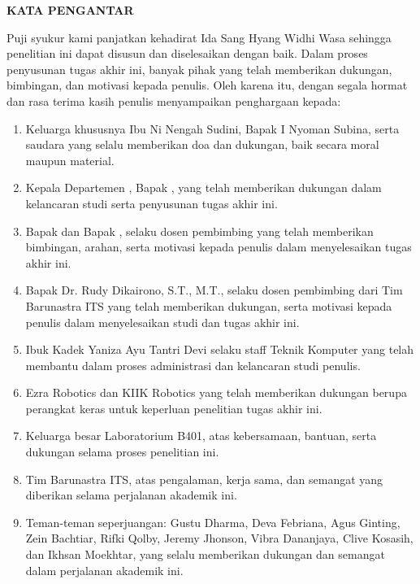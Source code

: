 \begin{center}
  \Large
  \textbf{KATA PENGANTAR}
\end{center}


\vspace{2ex}


Puji syukur kami panjatkan kehadirat Ida Sang Hyang Widhi Wasa  sehingga penelitian ini dapat disusun dan diselesaikan dengan baik. Dalam proses penyusunan tugas akhir ini, banyak pihak yang telah memberikan dukungan, bimbingan, dan motivasi kepada penulis. Oleh karena itu, dengan segala hormat dan rasa terima kasih  penulis menyampaikan penghargaan kepada:

\begin{enumerate}[nolistsep]
  \item Keluarga khususnya Ibu Ni Nengah Sudini, Bapak I Nyoman Subina, serta saudara yang selalu memberikan doa dan dukungan, baik secara moral maupun material.
  \item Kepala Departemen \studyprogram{}, Bapak \headofdepartment{}, yang telah memberikan dukungan dalam kelancaran studi serta penyusunan tugas akhir ini.
  \item Bapak \advisor{} dan Bapak \coadvisor{}, selaku dosen pembimbing yang telah memberikan bimbingan, arahan, serta motivasi kepada penulis dalam menyelesaikan tugas akhir ini.
  \item Bapak Dr. Rudy Dikairono, S.T., M.T., selaku dosen pembimbing dari Tim Barunastra ITS yang telah memberikan dukungan, serta motivasi kepada penulis dalam menyelesaikan studi dan tugas akhir ini.
  \item Ibuk Kadek Yaniza Ayu Tantri Devi selaku staff Teknik Komputer yang telah membantu dalam proses administrasi dan kelancaran studi penulis.
  \item Ezra Robotics dan KIIK Robotics yang telah memberikan dukungan berupa perangkat keras untuk keperluan penelitian tugas akhir ini.
  \item Keluarga besar Laboratorium B401, atas kebersamaan, bantuan, serta dukungan selama proses penelitian ini.
  \item Tim Barunastra ITS, atas pengalaman, kerja sama, dan semangat yang diberikan selama perjalanan akademik ini.
  \item Teman-teman seperjuangan: Gustu Dharma, Deva Febriana, Agus Ginting, Zein Bachtiar, Rifki Qolby, Jeremy Jhonson, Vibra Dananjaya, Clive Kosasih, dan Ikhsan Moekhtar, yang selalu memberikan dukungan dan semangat dalam perjalanan akademik ini.
\end{enumerate}

